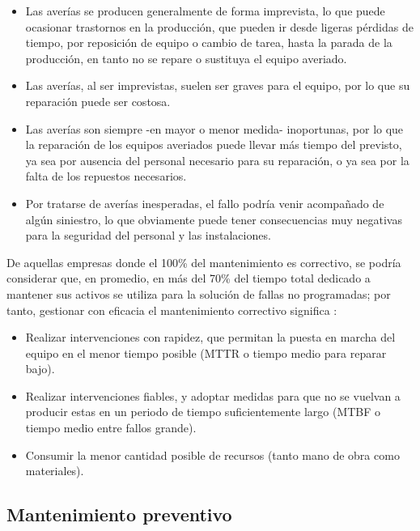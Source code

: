 \begin{itemize}
\item Las averías se producen generalmente de forma imprevista, lo que puede ocasionar trastornos en la producción, que pueden ir desde ligeras pérdidas de tiempo, por reposición de equipo o cambio de tarea, hasta la parada de la producción, en tanto no se repare o sustituya el equipo averiado.
\item Las averías, al ser imprevistas, suelen ser graves para el equipo, por lo que su reparación puede ser costosa.
\item Las averías son siempre -en mayor o menor medida- inoportunas, por lo que la reparación de los equipos averiados puede llevar más tiempo del previsto, ya sea por ausencia del personal necesario para su reparación, o ya sea por la falta de los repuestos necesarios.
\item Por tratarse de averías inesperadas, el fallo podría venir acompañado de algún siniestro, lo que obviamente puede tener consecuencias muy negativas para la seguridad del personal y las instalaciones.
\end{itemize}

De aquellas empresas donde el 100\% del mantenimiento es correctivo, se podría considerar que, en promedio, en más del 70\% del tiempo total dedicado a mantener sus activos se utiliza para la solución de fallas no programadas; por tanto, gestionar con eficacia el mantenimiento correctivo significa \parencite{garcia2010}:

\begin{itemize}
\item Realizar intervenciones con rapidez, que permitan la puesta en marcha del equipo en el menor tiempo posible (MTTR o tiempo medio para reparar bajo).
\item Realizar intervenciones fiables, y adoptar medidas para que no se vuelvan a producir estas en un periodo de tiempo suficientemente largo (MTBF o tiempo medio entre fallos grande).
\item Consumir la menor cantidad posible de recursos (tanto mano de obra como materiales).
\end{itemize}

\subsection{Mantenimiento preventivo}

